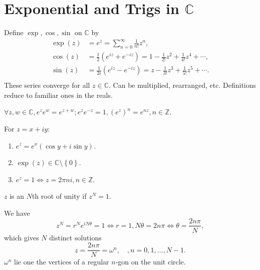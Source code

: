 \documentclass[10pt]{article}
\begin{document}
    \section{Exponential and Trigs in $\mathbb{C}$}
    \begin{definition}
        Define $ \exp, \cos, \sin $ on $ \mathbb{C} $ by
        \[
            \begin{aligned}
                 \exp(z)&= e^z = \sum_{n=0}^{\infty} \frac{1}{n!}z^n,\\
                 \cos(z)&= \frac{1}{2}(e^{iz}+e^{-iz}) = 1-\frac{1}{2!}z^2+\frac{1}{4!}z^4+\cdots,\\
                 \sin(z)&= \frac{1}{2i}(e^{iz}-e^{-iz}) = z-\frac{1}{3!}z^3+\frac{1}{5!}z^5+\cdots.\\
            \end{aligned}
        \]
        These series converge for all $ z\in \mathbb{C} $. Can be multiplied, rearranged, etc. Definitions reduce to familiar ones in the reals.
    \end{definition}
    \begin{proposition}\label{prop:exp multi}
        $ \forall z,w\in \mathbb{C}, e^ze^w=e^{z+w}; e^ze^{-z}=1, (e^z)^n =e^{nz}, n\in \mathbb{Z}$.
    \end{proposition}
    \begin{lemma}\label{lma:exp_arth}
        For $z=x+iy$:
        \begin{enumerate}[(1)]
            \item $ e^z = e^x(\cos y+i\sin y) $.
            \item $ \exp(z)\in \mathbb{C} \setminus \left\{ 0\right\} $.
            \item $ e^z = 1 \Leftrightarrow z = 2\pi n i, n\in \mathbb{Z} $.
        \end{enumerate}
    \end{lemma}
    \begin{definition}
        $z$ is an $ N $th root of unity if $ z^N=1 $.
    \end{definition}
    We have 
    \[
        z^N=r^Ne^{iN\theta} =1 \Longleftrightarrow r=1, N\theta = 2n\pi \Longleftrightarrow \theta = \frac{2n\pi}{N}
    ,\]
    which gives $N$ distinct solutions
    \[
        z = \frac{2n\pi}{N} = \omega^n, \quad, n=0,1,\dots, N-1
    .\]
    $\omega^n$ lie one the vertices of a regular $n$-gon on the unit circle.
\end{document}
